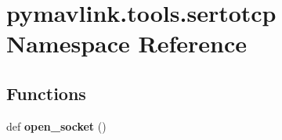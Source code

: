\hypertarget{namespacepymavlink_1_1tools_1_1sertotcp}{}\section{pymavlink.\+tools.\+sertotcp Namespace Reference}
\label{namespacepymavlink_1_1tools_1_1sertotcp}
\subsection*{Functions}
\begin{DoxyCompactItemize}
\item 
\mbox{\label{namespacepymavlink_1_1tools_1_1sertotcp_acea7267f0cbd70801a3173f386311131}} 
def {\bfseries open\+\_\+socket} ()
\end{DoxyCompactItemize}
